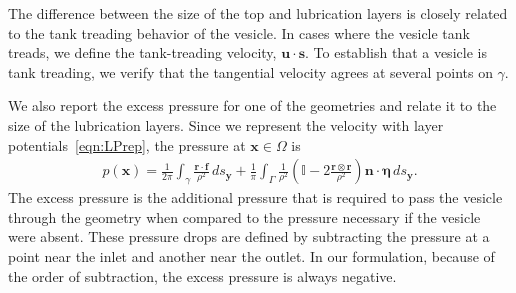 \documentclass[twoside,twocolumn,9pt]{article}
\newcommand{\ff}{\mathbf{f}}
\newcommand{\eeta}{\boldsymbol{\eta}}
\newcommand{\nn}{\mathbf{n}}
\newcommand{\rr}{\mathbf{r}}
\renewcommand{\ss}{\mathbf{s}}
\newcommand{\uu}{\mathbf{u}}
\newcommand{\xx}{\mathbf{x}}
\newcommand{\yy}{\mathbf{y}}
\newcommand{\subfigimg}[3][,]{%
  \setbox1=\hbox{\texttt{[image: \#3]}}%
  \leavevmode\rlap{\usebox1}%
  \rlap{\hspace*{0pt}\raisebox{\dimexpr\ht1-0\baselineskip}{\bf
  \normalsize #2}}%
  \phantom{\usebox1}%
}
\begin{document}

The difference between the size of the top and lubrication layers is
closely related to the tank treading behavior of the vesicle. In cases
where the vesicle tank treads, we define the tank-treading velocity,
$\uu \cdot \ss$. To establish that a vesicle is tank treading, we verify
that the tangential velocity agrees at several points on $\gamma$.


We also report the excess pressure for one of the geometries and relate
it to the size of the lubrication layers. Since we represent the
velocity with layer potentials~\eqref{eqn:LPrep}, the pressure at $\xx
\in \Omega$ is
\begin{align}
  p(\xx) = \frac{1}{2\pi} \int_{\gamma} \frac{\rr \cdot \ff}{\rho^2} \, ds_\yy + 
    \frac{1}{\pi} \int_{\Gamma} \frac{1}{\rho^2} 
    \left(\mathds{I} - 2\frac{\rr \otimes \rr}{\rho^2} \right) 
    \nn \cdot \eeta \, ds_\yy.
\end{align}
The excess pressure is the additional pressure that is required to pass
the vesicle through the geometry when compared to the pressure necessary
if the vesicle were absent. These pressure drops are defined by
subtracting the pressure at a point near the inlet and another near the
outlet. In our formulation, because of the order of subtraction, the
excess pressure is always negative.
\end{document}
